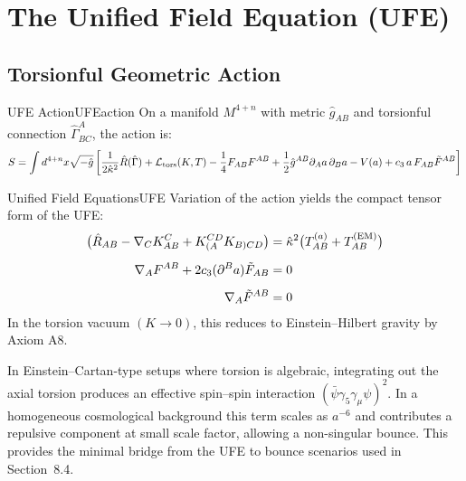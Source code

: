 \section{The Unified Field Equation (UFE)}

\subsection{Torsionful Geometric Action}

\begin{definition}{UFE Action}{UFEaction}
On a manifold $M^{4+n}$ with metric $\hat{g}_{AB}$ and torsionful connection 
$\hat{\Gamma}^A_{BC}$, the action is:
\begin{equation}
    S = \int d^{4+n}x\sqrt{-\hat{g}}\left[
        \frac{1}{2\hat{\kappa}^2}\hat{R}(\hat{\Gamma}) 
        + \mathcal{L}_{\text{tors}}(K,T) 
        - \frac{1}{4}F_{AB}F^{AB}
        + \frac{1}{2}\hat{g}^{AB}\partial_A a\,\partial_B a 
        - V(a) 
        + c_3\, a\, F_{AB}\tilde{F}^{AB}
    \right]
\end{equation}
\end{definition}

\begin{theorem}{Unified Field Equations}{UFE}
Variation of the action yields the compact tensor form of the UFE:
\begin{align}
    \bigl(\hat{R}_{AB} - \nabla_C K^C_{AB} + K_{(A}^{CD}K_{B)CD}\bigr) 
        &= \hat{\kappa}^2\bigl(T^{(a)}_{AB} + T^{(\text{EM})}_{AB}\bigr)
        \label{eq:UFE}\\[0.5em]
    \nabla_A F^{AB} + 2c_3(\partial^B a)\tilde{F}_{AB} &= 0
        \label{eq:maxwell}\\[0.5em]
    \nabla_A\tilde{F}^{AB} &= 0
        \label{eq:bianchi}
\end{align}
In the torsion vacuum $(K \to 0)$, this reduces to Einstein--Hilbert gravity 
by Axiom A8.
\end{theorem}

\begin{tcolorbox}[colback=blue!3, colframe=blue!40,
    title={\textbf{Lemma (Torsion-Induced Bounce Term)}}, fonttitle=\bfseries\small]
In Einstein--Cartan-type setups where torsion is algebraic, integrating out the
axial torsion produces an effective spin--spin interaction
$(\bar{\psi}\gamma_5\gamma_\mu\psi)^2$. In a homogeneous cosmological background this term
scales as $a^{-6}$ and contributes a repulsive component at small scale factor,
allowing a non-singular bounce. This provides the minimal bridge from the UFE to
bounce scenarios used in Section~8.4.
\end{tcolorbox}

